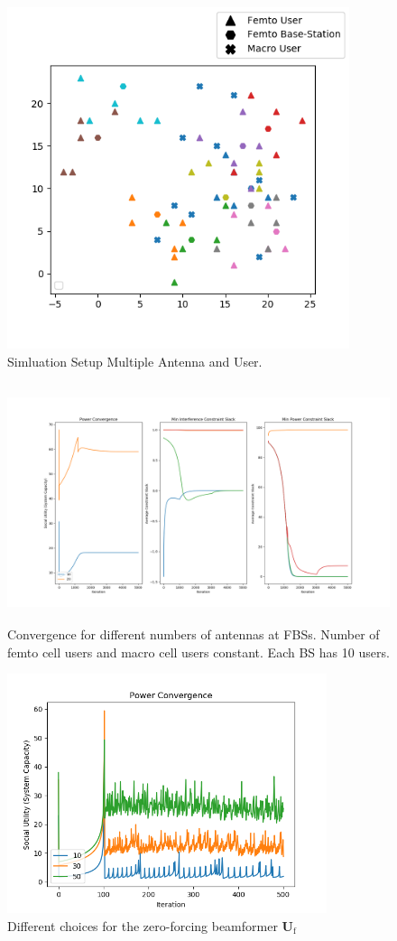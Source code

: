 \documentclass[12pt,a4paper]{report}
\begin{document}
\begin{figure}[H]
	\includegraphics[width=\textwidth,height = 10cm]{figures/system_figure_multiple}
	  \caption{Simluation Setup Multiple Antenna and User.
	  }
\end{figure}


\begin{figure}[H]
	  	\includegraphics[width=\textwidth,height = 7cm]{figures/increasing_antenna}
	  		  \caption{Convergence for different numbers of antennas at FBSs. Number of femto cell users and macro cell users constant. Each BS has 10 users.}
	  \label{fig:}
\end{figure}


\begin{figure}[H]
	  	\includegraphics[width=\textwidth,height = 7cm]{figures/increasing_antenna_game_beamformer}
	  		  \caption{Different choices for the zero-forcing beamformer $\mathbf{U}_{\text{f}}$}
	  \label{fig:inc_fc}
\end{figure}
\end{document}
